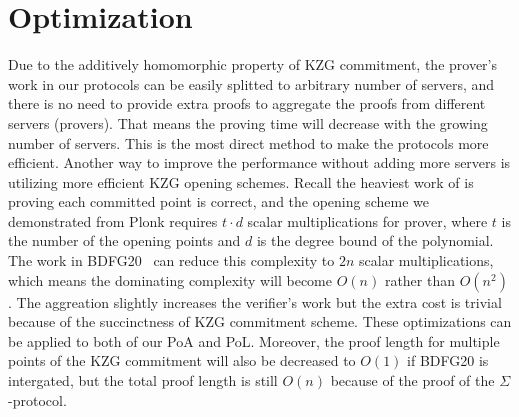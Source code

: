 \section{Optimization}
\label{sec:opt}
Due to the additively homomorphic property of KZG commitment, the prover's work in our protocols can be easily splitted to arbitrary number of servers, and there is no need to provide extra proofs to aggregate the proofs from different servers (provers). That means the proving time will decrease with the growing number of servers. This is the most direct method to make the protocols more efficient. Another way to improve the performance without adding more servers is utilizing more efficient KZG opening schemes. Recall the heaviest work of \bootstrap is proving each committed point is correct, and the opening scheme we demonstrated from Plonk requires $t\cdot{d}$ scalar multiplications for prover, where $t$ is the number of the opening points and $d$ is the degree bound of the polynomial. The work in BDFG20~\cite{bdfg} can reduce this complexity to $2n$ scalar multiplications, which means the dominating complexity will become $O(n)$ rather than $O(n^2)$. The aggreation slightly increases the verifier's work but the extra cost is trivial because of the succinctness of KZG commitment scheme. These optimizations can be applied to both of our PoA and PoL. Moreover, the proof length for multiple points of the KZG commitment will also be decreased to $O(1)$ if BDFG20 is intergated, but the total proof length is still $O(n)$ because of the proof of the $\Sigma$-protocol.



